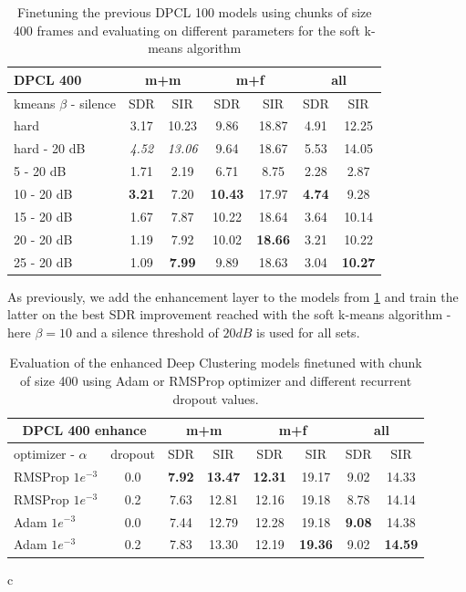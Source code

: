 \documentclass[master, tikz, final,11pt, dvipdfmx]{iscs-thesis}
\begin{document}
\begin{table}[h]
\centering
\begin{tabular}{l|c|c|c|c|c|c}
DPCL 400 & \multicolumn{2}{c|}{m+m} & \multicolumn{2}{c|}{m+f} & \multicolumn{2}{c}{all} \\ 
\hline 
kmeans $\beta$ - silence & SDR & SIR & SDR & SIR & SDR & SIR \\ 
\hline 
hard & 3.17 & 10.23  & 9.86 & 18.87 & 4.91 & 12.25 \\ 
hard - 20 dB & \textit{4.52} & \textit{13.06} & 9.64 & 18.67 & 5.53 & 14.05 \\ 
\hline 
\hline 
5 - 20 dB & 1.71 & 2.19 & 6.71 & 8.75 & 2.28 & 2.87 \\ 
10 - 20 dB & \cellcolor{green}\textbf{3.21} & \cellcolor{green}7.20 & \cellcolor{green}\textbf{10.43} & \cellcolor{green}17.97 & \cellcolor{green}\textbf{4.74} & \cellcolor{green}9.28 \\ 
15 - 20 dB & 1.67 & 7.87 & 10.22 & 18.64 & 3.64 & 10.14 \\ 
20 - 20 dB & 1.19 & 7.92 & 10.02 & \textbf{18.66} & 3.21 & 10.22 \\ 
25 - 20 dB & 1.09 & \textbf{7.99} & 9.89 & 18.63 & 3.04 & \textbf{10.27} \\ 
\end{tabular}
\caption[Finetuning of Deep Clustering models with chunks of size 400]{Finetuning the previous DPCL 100 models using chunks of size 400 frames and evaluating on different parameters for the soft k-means algorithm}
\label{table:DPCL400}
\end{table}

As previously, we add the enhancement layer to the models from \ref{table:DPCL400} and train the latter on the best SDR improvement reached with the soft k-means algorithm - here $\beta = 10$ and a silence threshold of $20dB$ is used for all sets. 

\begin{table}[h]
\centering
\begin{tabular}{l|c|c|c|c|c|c|c}
\multicolumn{2}{c|}{DPCL 400 enhance} & \multicolumn{2}{c|}{m+m} & \multicolumn{2}{c|}{m+f} & \multicolumn{2}{c}{all} \\ 
\hline 
optimizer - $\alpha$ & dropout & SDR & SIR & SDR & SIR & SDR & SIR \\ 
\hline 
RMSProp $1e^{-3}$ & 0.0 & \textbf{7.92} & \textbf{13.47} & \textbf{12.31} & 19.17 & 9.02 & 14.33 \\ 
RMSProp $1e^{-3}$ & 0.2 & 7.63 & 12.81 & 12.16 & 19.18 & 8.78 & 14.14 \\ 
Adam $1e^{-3}$ & 0.0 & 7.44 & 12.79 & 12.28 & 19.18 & \textbf{9.08} & 14.38 \\
Adam $1e^{-3}$ & 0.2 & 7.83 & 13.30 & 12.19 & \textbf{19.36} & 9.02 & \textbf{14.59}\\ 
\end{tabular}
c\caption[Enhancement of Deep Clustering trained with 400 frames chunks size]{Evaluation of the enhanced Deep Clustering models finetuned with chunk of size 400 using Adam or RMSProp optimizer and different recurrent dropout values.}
\label{table:DPCL400enh}
\end{table}
\end{document}
